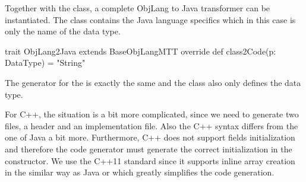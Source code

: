 Together with the \href{https://github.com/fikovnik/ttc14-fixml-sigma/blob/master/ttc14-fixml-base/src/fr/inria/spirals/sigma/ttc14/fixml/ObjLang2Java.scala}{} class, a complete ObjLang to Java transformer can be instantiated.
The class \href{https://github.com/fikovnik/ttc14-fixml-sigma/blob/master/ttc14-fixml-base/src/fr/inria/spirals/sigma/ttc14/fixml/ObjLang2Java.scala}{} contains the Java language specifics which in this case is only the name of the  data type.
%
\begin{scalacode}
trait ObjLang2Java extends BaseObjLangMTT {
  override def class2Code(p: DataType) = "String"
}
\end{scalacode}

The generator for the \Csharp is exactly the same and the class \href{https://github.com/fikovnik/ttc14-fixml-sigma/blob/master/ttc14-fixml-base/src/fr/inria/spirals/sigma/ttc14/fixml/ObjLang2CSharp.scala}{} also only defines the  data type.

For C++, the situation is a bit more complicated, since we need to generate two files, a header and an implementation file.
Also the C++ syntax differs from the one of Java a bit more.
Furthermore, C++ does not support fields initialization and therefore the code generator must generate the correct initialization in the constructor.
We use the C++11 standard since it supports inline array creation in the similar way as Java or \Csharp which greatly simplifies the code generation.